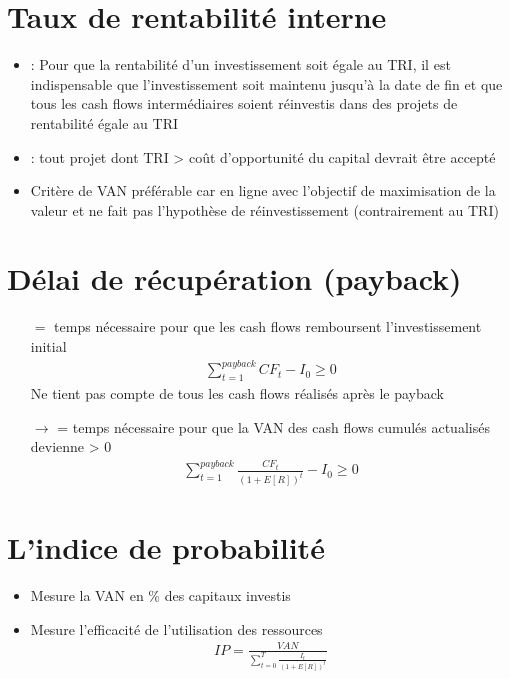 \section{Taux de rentabilité interne}

\begin{itemize}
    \item {} : Pour que la rentabilité d’un investissement soit égale au TRI, il est indispensable que l’investissement soit maintenu jusqu’à la date de fin et que tous les cash flows intermédiaires soient réinvestis dans des projets de rentabilité égale au TRI
    \item {} : tout projet dont TRI > coût d'opportunité du capital devrait être accepté
    \item Critère de VAN préférable car en ligne avec l'objectif de maximisation de la valeur et ne fait pas l'hypothèse de réinvestissement (contrairement au TRI)
\end{itemize}

\section{Délai de récupération (payback)}

\begin{itemize}
    \item[$=$] temps nécessaire pour que les cash flows remboursent l'investissement initial
    \begin{align*}
        \sum_{t=1}^{payback} CF_t - I_0 \geq 0
    \end{align*}
    \warning Ne tient pas compte de tous les cash flows réalisés après le payback
    \item[$\rightarrow$]  = temps nécessaire pour que la VAN des cash flows cumulés actualisés devienne > 0
    \begin{align*}
        \sum_{t=1}^{payback} \frac{CF_t}{(1 + E[R])^t} - I_0 \geq 0
    \end{align*}
\end{itemize}

\section{L'indice de probabilité}

\begin{itemize}
    \item Mesure la VAN en \% des capitaux investis
    \item Mesure l'efficacité de l'utilisation des ressources
    \begin{align*}
        IP = \frac{VAN}{\sum_{t=0}^T \frac{I_t}{(1+E[R])^t}}
    \end{align*}
\end{itemize}

